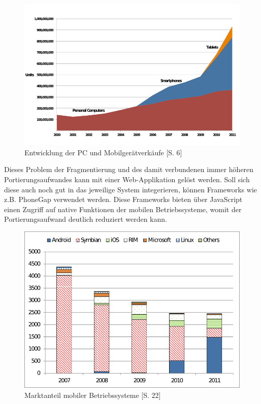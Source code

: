 \documentclass[a4paper,bibtotoc,oneside]{scrbook}
\begin{document}
\begin{figure}[h!]
\centering
\includegraphics[width=150mm]{img/globaldevicesales.png}
\caption[Entwicklung der PC und Mobilgerätverkäufe]{Entwicklung der PC und Mobilgerätverkäufe \cite{devicesales}[S. 6]}\label{Abb1}
\end{figure}

Dieses Problem der Fragmentierung und des damit verbundenen immer höheren Portierungsaufwandes kann mit einer Web-Applikation gelöst werden. Soll sich diese auch noch gut in das jeweilige System integerieren, können Frameworks wie z.B. PhoneGap \cite{phonegap} verwendet werden. Diese Frameworks bieten über JavaScript einen Zugriff auf native Funktionen der mobilen Betriebssysteme, womit der Portierungsaufwand deutlich reduziert werden kann. 

\begin{figure}[h!]
\centering
\includegraphics[width=130mm]{img/operatingsystems.png}
\caption[Marktanteil mobiler Betriebssysteme]{Marktanteil mobiler Betriebssysteme \cite{smartphone}[S. 22]}\label{Abb2}
\end{figure}
\end{document}
